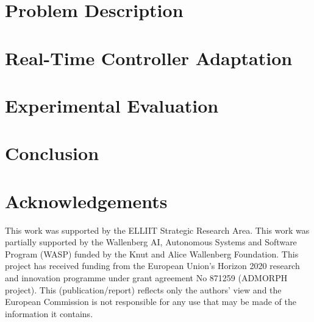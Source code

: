 \section{Problem Description}
\label{sec:problem-descr}


\section{Real-Time Controller Adaptation}
\label{sec:darc}


\section{Experimental Evaluation}
\label{sec:results}


\section{Conclusion}
\label{sec:conclusion}


\section*{Acknowledgements}
This work was supported by the ELLIIT Strategic Research Area.
This work was partially supported by the Wallenberg AI, Autonomous Systems and Software Program (WASP) funded by the Knut and Alice Wallenberg Foundation.
This project has received funding from the European Union's Horizon 2020 research and innovation programme under grant agreement No 871259 (ADMORPH project). This (publication/report) reflects only the authors' view and the European Commission is not responsible for any use that may be made of the information it contains.


\printbibliography[heading=subbibliography]
